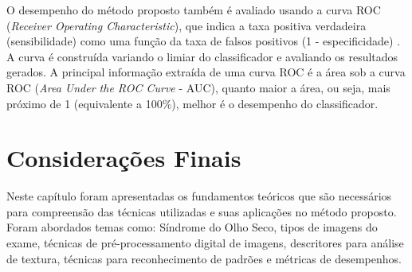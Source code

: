 O desempenho do método proposto também é avaliado usando a curva ROC (\textit{Receiver Operating Characteristic}), que indica a taxa positiva verdadeira (sensibilidade) como uma função da taxa de falsos positivos (1 - especificidade) \cite{fawcett2006introduction}. A curva é construída variando o limiar do classificador e avaliando os resultados gerados. A principal informação extraída de uma curva ROC é a área sob a curva ROC (\textit{Area Under the ROC Curve} - AUC), quanto maior a área, ou seja, mais próximo de 1 (equivalente a 100\%), melhor é o desempenho do classificador.


\section{Considerações Finais}

Neste capítulo foram apresentadas os fundamentos teóricos que são necessários para compreensão das técnicas utilizadas e suas aplicações no método proposto. Foram abordados temas como: Síndrome do Olho Seco, tipos de imagens do exame, técnicas de pré-processamento digital de imagens, descritores para análise de textura, técnicas para reconhecimento de padrões e métricas de desempenhos.
